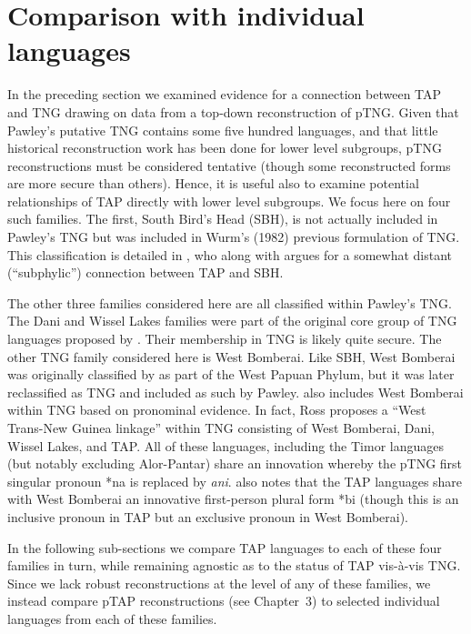 \section{Comparison with individual languages} \label{sec:4:5}
In the preceding section we examined evidence for a connection between TAP and TNG drawing on data from a top-down reconstruction of pTNG. Given that Pawley's putative TNG contains some five hundred languages, and that little historical reconstruction work has been done for lower level subgroups, pTNG reconstructions must be considered tentative (though some reconstructed forms are more secure than others). Hence, it is useful also to examine potential relationships of TAP directly with lower level subgroups. We focus here on four such families. The first, South Bird's Head (SBH), is not actually included in Pawley's TNG but was included in Wurm's (1982) previous formulation of TNG. This classification is detailed in \citet{Voorhoeve1975}, who along with \citet{Stokhof1975} argues for a somewhat distant (``subphylic'') connection between TAP and SBH. \nocite{Wurm1982}

The other three families considered here are all classified within Pawley's TNG. The Dani and Wissel Lakes families were part of the original core group of TNG languages proposed by \citet{WurmEtAl1975}. Their membership in TNG is likely quite secure. The other TNG family considered here is West Bomberai. Like SBH, West Bomberai was originally classified by \citet{Cowan1957} as part of the West Papuan Phylum, but it was later reclassified as TNG and included as such by Pawley. \citet{Ross2005} also includes West Bomberai within TNG based on pronominal evidence. In fact, Ross proposes a ``West Trans-New Guinea linkage'' within TNG consisting of West Bomberai, Dani, Wissel Lakes, and TAP. All of these languages, including the Timor languages (but notably excluding Alor-Pantar) share an innovation whereby the pTNG first singular pronoun *na is replaced by \textit{ani}. \citet[37]{Ross2005} also notes that the TAP languages share with West Bomberai an innovative first-person plural form *bi (though this is an inclusive
pronoun in TAP but an exclusive pronoun in West Bomberai).

In the following sub-sections we compare TAP languages to each of these four families in turn, while remaining agnostic as to the status of TAP vis-\`a-vis TNG. Since we lack robust reconstructions at the level of any of these families, we instead compare pTAP reconstructions (see Chapter~3) to selected individual languages from each of these families.

